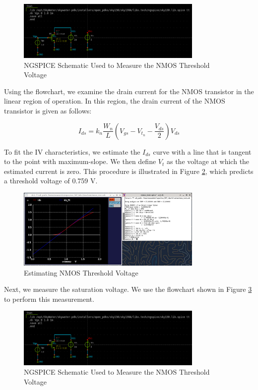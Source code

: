 \documentclass[fleqn]{article}
\begin{document}
	\begin{figure}[H]
		\centerline{\includegraphics[width=0.8\textwidth]{nmos_vt_meas_schem.png}}
		\caption{NGSPICE Schematic Used to Measure the NMOS Threshold Voltage}
		\label{fig::nmos_vt_meas_schem}
	\end{figure}
	
	\noindent Using the flowchart, we examine the drain current for the NMOS transistor in the linear region of operation. In this region, the drain current of the NMOS transistor is given as follows:
	
	\begin{equation}
		I_{ds} = k_n\frac{W_n}{L}\left(V_{gs} - V_{t_n} - \frac{V_{ds}}{2}\right)V_{ds}
	\end{equation}
	
	\noindent To fit the IV characteristics, we estimate the $I_{ds}$ curve with a line that is tangent to the point with maximum-slope. We then define $V_t$ as the voltage at which the estimated current is zero. This procedure is illustrated in Figure \ref{fig::nmos_vt_meas}, which predicts a threshold voltage of 0.759 V.
	
	\begin{figure}[H]
		\centerline{\includegraphics[width=0.8\textwidth]{nmos_vt_meas.png}}
		\caption{Estimating NMOS Threshold Voltage}
		\label{fig::nmos_vt_meas}
	\end{figure}
	
	Next, we measure the saturation voltage. We use the flowchart shown in Figure \ref{fig::nmos_vt_meas_schem} to perform this measurement.
	
	\begin{figure}[H]
		\centerline{\includegraphics[width=0.8\textwidth]{nmos_vt_meas_schem.png}}
		\caption{NGSPICE Schematic Used to Measure the NMOS Threshold Voltage}
		\label{fig::nmos_vt_meas_schem}
	\end{figure}
	
\end{document}
